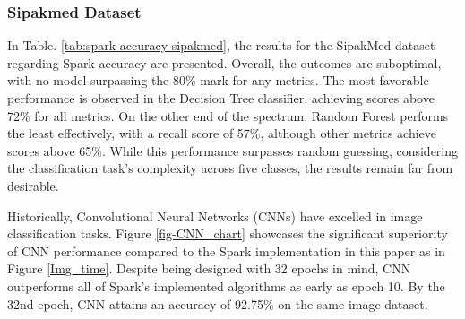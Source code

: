 \documentclass[12pt]{report}
\begin{document}
\subsubsection{Sipakmed Dataset}



In Table. \ref{tab:spark-accuracy-sipakmed}, the results for the SipakMed dataset regarding Spark accuracy are presented. Overall, the outcomes are suboptimal, with no model surpassing the 80\% mark for any metrics. The most favorable performance is observed in the Decision Tree classifier, achieving scores above 72\% for all metrics. On the other end of the spectrum, Random Forest performs the least effectively, with a recall score of 57\%, although other metrics achieve scores above 65\%. While this performance surpasses random guessing, considering the classification task's complexity across five classes, the results remain far from desirable.

Historically, Convolutional Neural Networks (CNNs) have excelled in image classification tasks\cite{CNN}. Figure \ref{fig-CNN_chart} showcases the significant superiority of CNN performance compared to the Spark implementation in this paper as in Figure \ref{Img_time}. Despite being designed with 32 epochs in mind, CNN outperforms all of Spark's implemented algorithms as early as epoch 10. By the 32nd epoch, CNN attains an accuracy of 92.75\% on the same image dataset.
\end{document}
